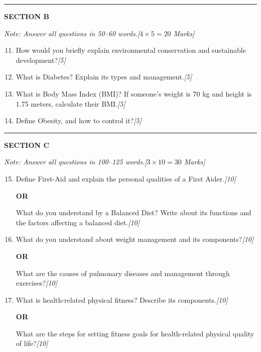 \documentclass[11pt,a4paper]{article}
\newcommand{\pts}[1]{\hfill   \textit{[#1]}}
\begin{document}
\bigskip
\rule{\linewidth}{0.2pt}
\medskip

\centerline{   \textbf{SECTION B}}
\smallskip



\noindent   \textit{Note: Answer all questions in 50--60 words.\hfill [$4  \times 5 = 20$ Marks]}


\begin{enumerate}[label=   \textbf{\arabic*.}]
    \setcounter{enumi}{10}
    \item How would you briefly explain environmental conservation and sustainable development?\pts{5}
    \item What is Diabetes? Explain its types and management.\pts{5}
    \item What is Body Mass Index (BMI)? If someone's weight is 70 kg and height is 1.75 meters, calculate their BMI.\pts{5}
    \item Define Obesity, and how to control it?\pts{5}
\end{enumerate}

\bigskip
\rule{\linewidth}{0.2pt}
\medskip

\centerline{   \textbf{SECTION C}}
\smallskip



\noindent   \textit{Note: Answer all questions in 100--125 words.\hfill [$3  \times 10 = 30$ Marks]}


\begin{enumerate}[label=   \textbf{\arabic*.}]
    \setcounter{enumi}{14}
    \item Define First-Aid and explain the personal qualities of a First Aider.\pts{10}
    
\begin{center}   \textbf{OR}\end{center}
    What do you understand by a Balanced Diet? Write about its functions and the factors affecting a balanced diet.\pts{10}

    \item What do you understand about weight management and its components?\pts{10}
    
\begin{center}   \textbf{OR}\end{center}
    What are the causes of pulmonary diseases and management through exercises?\pts{10}

    \item What is health-related physical fitness? Describe its components.\pts{10}
    
\begin{center}   \textbf{OR}\end{center}
    What are the steps for setting fitness goals for health-related physical quality of life?\pts{10}
\end{enumerate}
\end{document}
